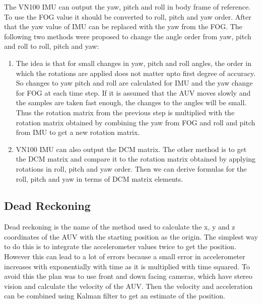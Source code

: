 The VN100 IMU can output the yaw, pitch and roll in body frame of reference.
To use the FOG value it should be converted to roll, pitch and yaw order.
After that the yaw value of IMU can be replaced with the yaw from the FOG.
The following two methods were proposed to change the angle order from yaw,
pitch and roll to roll, pitch and yaw:
\begin{enumerate}
\item The idea is that for small changes in yaw, pitch and roll angles,
    the order in which the rotations are applied does not matter upto first
    degree of accuracy. So changes to yaw pitch and roll are calculated for
    IMU and the yaw change for FOG at each time step. If it is assumed that
    the AUV moves slowly and the samples are taken fast enough, the changes
    to the angles will be small. Thus the rotation matrix from the previous
    step is multiplied with the rotation matrix obtained by combining the yaw
    from FOG and roll and pitch from IMU to get a new rotation matrix.
\item VN100 IMU can also output the DCM matrix. The other method is to
    get the DCM matrix and compare it to the rotation matrix obtained by
    applying rotations in roll, pitch and yaw order. Then we can derive
    formulas for the roll, pitch and yaw in terms of DCM matrix elements.
\end{enumerate}

\subsection{Dead Reckoning}
Dead reckoning is the name of the method used to calculate the x, y and z
coordinates of the AUV with the starting position as the origin.
The simplest way to do this is to integrate the accelerometer values
twice to get the position. However this can lead to a lot of errors
because a small error in accelerometer increases with exponentially with
time as it is multiplied with time squared. To avoid this the plan was
to use front and down facing cameras, which have stereo vision and
calculate the velocity of the AUV. Then the velocity and acceleration
can be combined using Kalman filter to get an estimate of the position.
